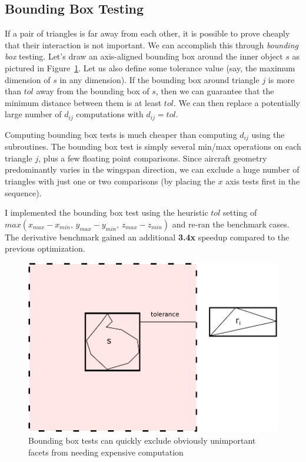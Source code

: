 \documentclass[11pt,letterpaper]{article}
\begin{document}
\subsection{Bounding Box Testing}
\qquad If a pair of triangles is far away from each other, it is possible to prove cheaply that their interaction is not important.
We can accomplish this through \emph{bounding box} testing.
Let's draw an axis-aligned bounding box around the inner object $s$ as pictured in Figure~\ref{fig:bb-test}.
Let us also define some tolerance value (say, the maximum dimension of $s$ in any dimension).
If the bounding box around triangle $j$ is more than $tol$ away from the bounding box of $s$, then we can guarantee that the minimum distance between them is at least $tol$.
We can then replace a potentially large number of $d_{ij}$ computations with $d_{ij}=tol$.

\qquad Computing bounding box tests is much cheaper than computing $d_{ij}$ using the subroutines.
The bounding box test is simply several min/max operations on each triangle $j$, plus a few floating point comparisons.
Since aircraft geometry predominantly varies in the wingspan direction, we can exclude a huge number of triangles with just one or two comparisons (by placing the $x$ axis tests first in the sequence).

\qquad I implemented the bounding box test using the heuristic $tol$ setting of $max(x_{max}-x_{min},\,y_{max}-y_{min},\,z_{max}-z_{min})$ and re-ran the benchmark cases.
The derivative benchmark gained an additional \textbf{3.4x} speedup compared to the previous optimization.

\begin{figure}[ht]
  \centering
  \includegraphics[width=0.65\linewidth]{figures/bb_test}
  \caption{Bounding box tests can quickly exclude obviously unimportant facets from needing expensive computation}
  \label{fig:bb-test}
\end{figure}
\end{document}
